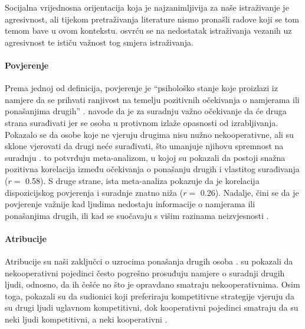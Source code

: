 \documentclass[a4paper, 12pt]{report}
\begin{document}
Socijalna vrijednosna orijentacija koja je najzanimljivija za naše istraživanje
je agresivnost, ali tijekom pretraživanja literature nismo pronašli radove koji
se tom temom bave u ovom kontekstu. 
 osvrću se na nedostatak istraživanja vezanih uz
agresivnost te ističu važnost tog smjera istraživanja.

\paragraph{Povjerenje} Prema jednoj od definicija, povjerenje je
\enquote{psihološko stanje koje proizlazi iz namjere da se prihvati ranjivost
    na temelju pozitivnih očekivanja o namjerama ili ponašanjima drugih}
\citep*[str. 395]{rousseau1998not}.
\citet{20yexg} navode da je za suradnju važno očekivanje da će druga
strana surađivati jer se osoba u protivnom izlaže opasnosti od izrabljivanja.
Pokazalo se da osobe koje ne vjeruju drugima nisu nužno nekooperativne, ali
su sklone vjerovati da drugi neće surađivati, što umanjuje njihovu spremnost na
suradnju \citep{vancoop}. \citet{balliet2013trust}
to potvrđuju meta-analizom, u kojoj su pokazali da postoji snažna pozitivna korelacija između očekivanja o
ponašanju drugih i vlastitog surađivanja ($r =$ 0.58). S druge strane, ista
meta-analiza pokazuje da je korelacija
dispozicijskog povjerenja i suradnje znatno  niža ($r =$ 0.26). Nadalje, čini se da je povjerenje važnije kad ljudima
nedostaju informacije o namjerama ili ponašanjima drugih, ili kad se suočavaju s
višim razinama neizvjesnosti \citep{vancoop}.  

\paragraph{Atribucije} Atribucije su naši zaključci o uzrocima ponašanja drugih
osoba \citep{aronson}. \citet{kelley1970inference} su pokazali da
nekooperativni pojedinci često pogrešno prosuđuju namjere o suradnji
drugih ljudi, odnosno, da ih češće no što je opravdano smatraju nekooperativnima. Osim
toga, pokazali su da sudionici koji preferiraju kompetitivne strategije vjeruju
da su drugi ljudi uglavnom kompetitivni, dok kooperativni pojedinci smatraju
da su neki ljudi kompetitivni, a neki kooperativni \citep{kelley1970social}.
\end{document}
